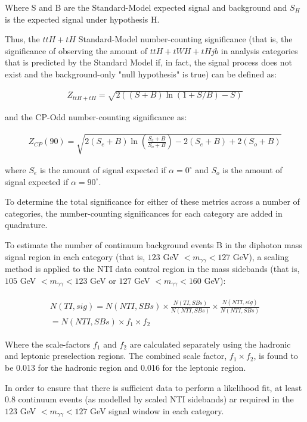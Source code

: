 Where S and B are the Standard-Model expected signal and background and $S_{H}$ is the expected signal under hypothesis H.

Thus, the $ttH+tH$ Standard-Model number-counting significance (that is, the significance of observing the amount of $ttH+tWH+tHjb$ in analysis categories that is predicted by the Standard Model if, in fact, the signal process does not exist and the background-only "null hypothesis" is true) can be defined as:

\begin{align}
Z_{ttH+tH} = \sqrt{2((S+B)\ln(1+S/B)-S)}
\label{eq:ncztth}
\end{align}

and the CP-Odd number-counting significance as:

\begin{align}
Z_{CP}(90) = \sqrt{2(S_e + B)\ln(\frac{S_e+B}{S_o + B}) -2(S_e + B) + 2(S_o + B)}
\label{eq:nczcp}
\end{align}

where $S_{e}$ is the amount of signal expected if $\alpha = 0^{\circ}$ and $S_{o}$ is the amount of signal expected if $\alpha = 90^{\circ}$.

To determine the total significance for either of these metrics across a number of categories, the number-counting significances for each category are added in quadrature.

To estimate the number of continuum background events B in the diphoton mass signal region in each category (that is, $123$ GeV $< m_{\gamma\gamma} < 127$ GeV), a scaling method is applied to the NTI data control region in the mass sidebands (that is, $105$ GeV $< m_{\gamma\gamma} < 123$ GeV or $127$ GeV $< m_{\gamma\gamma} < 160$ GeV):

\begin{align}
\begin{aligned}
N(TI,sig) = N(NTI, SBs)\times \frac{N(TI, SBs)}{N(NTI, SBs)} \times \frac{N(NTI, sig)}{N(NTI, SBs)} \\
= N(NTI, SBs) \times f_{1} \times f_{2}
\end{aligned}
\end{align}

Where the scale-factors $f_{1}$ and $f_{2}$ are calculated separately using the hadronic and leptonic preselection regions. The combined scale factor, $f_{1} \times f_{2}$, is found to be 0.013 for the hadronic region and 0.016 for the leptonic region. 

In order to ensure that there is sufficient data to perform a likelihood fit, at least 0.8 continuum events (as modelled by scaled NTI sidebands) ar required in the $123$ GeV $< m_{\gamma\gamma} < 127$ GeV signal window in each category.

